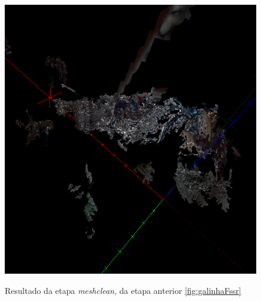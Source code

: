 



\begin{figure}[!h]
	\centering
		\caption{%
	Resultado da etapa \emph{meshclean}, da etapa anterior \ref{fig:galinhaFssr}
	}
	\includegraphics[width=0.7\linewidth]{figs/galinhameshclean.png}
		\label{fig:galinhaMeshClean}
\end{figure}

